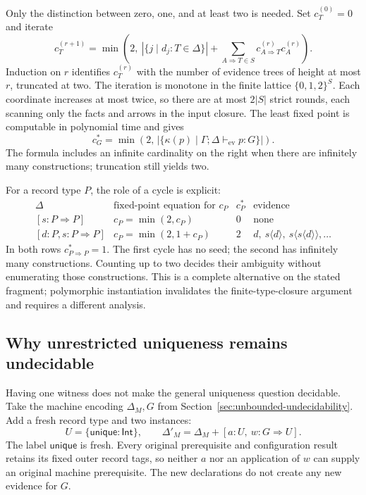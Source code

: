 \documentclass[10pt,a4paper]{article}
\newcommand{\Int}{\mathsf{Int}}
\newcommand{\Pj}[2]{\Gamma;\Delta\vdash_{\mathrm{ev}} #1:#2}
\newcommand{\iarg}[1]{\langle#1\rangle}
\newcommand{\kw}[1]{\mathsf{#1}}
\begin{document}
Only the distinction between zero, one, and at least two is needed. Set
$c_T^{(0)}=0$ and iterate
\[
 \boxed{c_T^{(r+1)}=
 \min\!\left(2,\
   |\{j\mid d_j:T\in\Delta\}|+
   \sum_{A\Rightarrow T\in S}
     c_{A\Rightarrow T}^{(r)}c_A^{(r)}\right).}
\]
Induction on $r$ identifies $c_T^{(r)}$ with the number of evidence trees of
height at most $r$, truncated at two. The iteration is monotone in the finite
lattice $\{0,1,2\}^{S}$. Each coordinate increases at most twice, so there are
at most $2|S|$ strict rounds, each scanning only the facts and arrows in the
input closure. The least fixed point is computable in polynomial time and gives
\[
 c_G^*=\min\!\left(2,\,
   |\{\kappa(p)\mid\Pj p G\}|\right).
\]
The formula includes an infinite cardinality on the right when there are
infinitely many constructions; truncation still yields two.

For a record type $P$, the role of a cycle is explicit:
\[
\begin{array}{c|c|c|l}
 \Delta & \text{fixed-point equation for }c_P & c_P^* & \text{evidence}\\ \hline
 {[s:P\Rightarrow P]} & c_P=\min(2,c_P) & 0 & \text{none}\\
 {[d:P,s:P\Rightarrow P]} & c_P=\min(2,1+c_P) & 2 & d,\ s\iarg{d},\ s\iarg{s\iarg{d}},\ldots
\end{array}
\]
In both rows $c_{P\Rightarrow P}^*=1$. The first cycle has no seed; the second
has infinitely many constructions. Counting up to two decides their ambiguity
without enumerating those constructions. This is a complete alternative on the
stated fragment; polymorphic instantiation invalidates the finite-type-closure
argument and requires a different analysis.

\newpage
\subsection{Why unrestricted uniqueness remains undecidable}
\label{sec:ambiguity-undecidable}
Having one witness does not make the general uniqueness question decidable.
Take the machine encoding $\Delta_M,G$ from
Section~\ref{sec:unbounded-undecidability}. Add a fresh record type and two
instances:
\[
 U=\{\kw{unique}:\Int\},\qquad
 \Delta'_M=\Delta_M+[a:U,\ w:G\Rightarrow U].
\]
The label $\kw{unique}$ is fresh. Every original prerequisite and configuration
result retains its fixed outer record tags, so neither $a$ nor an application
of $w$ can supply an original machine prerequisite. The new declarations do not
create any new evidence for $G$.
\end{document}
